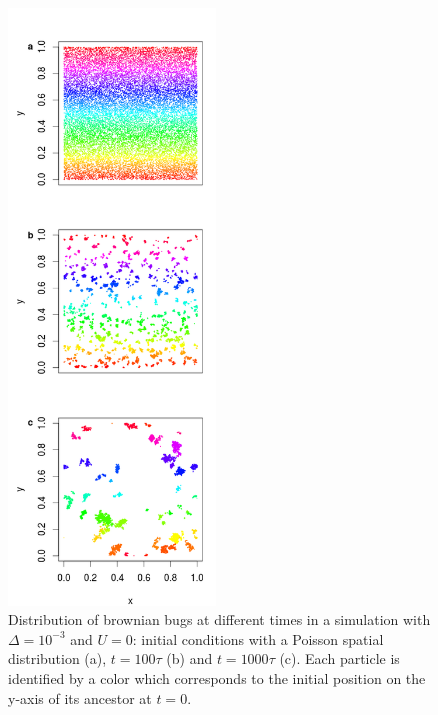 \begin{figure}[H]
\begin{center} 
 \includegraphics[width=0.49\textwidth]{../code/figure/spatial_distribution_Fig1.png}
  \caption{Distribution of brownian bugs at different times in a simulation with $\Delta=10^{-3}$ and $U=0$: initial conditions with a Poisson spatial distribution (a), $t=100\tau$ (b) and $t=1000\tau$ (c). Each particle is identified by a color which corresponds to the initial position on the y-axis of its ancestor at $t=0$.}
  \label{fig:spatial_fig1}
\end{center}
  \end{figure}


